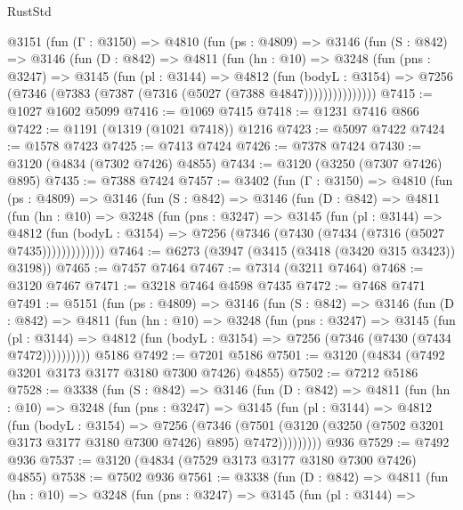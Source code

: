 \begin{lexlean}{RustStd}
\begin{coremodule}
{\begin{coremodule}
{{{{{{{{{{{{{{{{{{{{{{{{{{    @3151
      (fun (Γ : @3150) =>
      @4810
        (fun (ps : @4809) =>
        @3146
          (fun (S : @842) =>
          @3146
            (fun (D : @842) =>
            @4811
              (fun (hn : @10) =>
              @3248
                (fun (pns : @3247) =>
                @3145
                  (fun (pl : @3144) =>
                  @4812
                    (fun (bodyL : @3154) =>
                    @7256 (@7346 (@7383 (@7387 (@7316 (@5027 (@7388 @4847)))))))))))))))
@7415 := @1027 @1602 @5099
@7416 := @1069 @7415
@7418 := @1231 @7416 @866
@7422 := @1191 (@1319 (@1021 @7418)) @1216
@7423 := @5097 @7422
@7424 := @1578 @7423
@7425 := @7413 @7424
@7426 := @7378 @7424
@7430 := @3120 (@4834 (@7302 @7426) @4855)
@7434 := @3120 (@3250 (@7307 @7426) @895)
@7435 := @7388 @7424
@7457 := @3402
    (fun (Γ : @3150) =>
    @4810
      (fun (ps : @4809) =>
      @3146
        (fun (S : @842) =>
        @3146
          (fun (D : @842) =>
          @4811
            (fun (hn : @10) =>
            @3248
              (fun (pns : @3247) =>
              @3145
                (fun (pl : @3144) =>
                @4812
                  (fun (bodyL : @3154) =>
                  @7256 (@7346 (@7430 (@7434 (@7316 (@5027 @7435)))))))))))))
@7464 := @6273 (@3947 (@3415 (@3418 (@3420 @315 @3423)) @3198))
@7465 := @7457 @7464
@7467 := @7314 (@3211 @7464)
@7468 := @3120 @7467
@7471 := @3218 @7464 @4598 @7435
@7472 := @7468 @7471
@7491 := @5151
    (fun (ps : @4809) =>
    @3146
      (fun (S : @842) =>
      @3146
        (fun (D : @842) =>
        @4811
          (fun (hn : @10) =>
          @3248
            (fun (pns : @3247) =>
            @3145
              (fun (pl : @3144) =>
              @4812 (fun (bodyL : @3154) => @7256 (@7346 (@7430 (@7434 @7472))))))))))
    @5186
@7492 := @7201 @5186
@7501 := @3120 (@4834 (@7492 @3201 @3173 @3177 @3180 @7300 @7426) @4855)
@7502 := @7212 @5186
@7528 := @3338
    (fun (S : @842) =>
    @3146
      (fun (D : @842) =>
      @4811
        (fun (hn : @10) =>
        @3248
          (fun (pns : @3247) =>
          @3145
            (fun (pl : @3144) =>
            @4812
              (fun (bodyL : @3154) =>
              @7256
                (@7346
                  (@7501
                    (@3120 (@3250 (@7502 @3201 @3173 @3177 @3180 @7300 @7426) @895) @7472)))))))))
    @936
@7529 := @7492 @936
@7537 := @3120 (@4834 (@7529 @3173 @3177 @3180 @7300 @7426) @4855)
@7538 := @7502 @936
@7561 := @3338
    (fun (D : @842) =>
    @4811
      (fun (hn : @10) =>
      @3248
        (fun (pns : @3247) =>
        @3145
          (fun (pl : @3144) =>
}}}}}}}}}}}}}}}}}}}}}}}}}}
\end{coremodule}}
\end{coremodule}
\end{lexlean}
